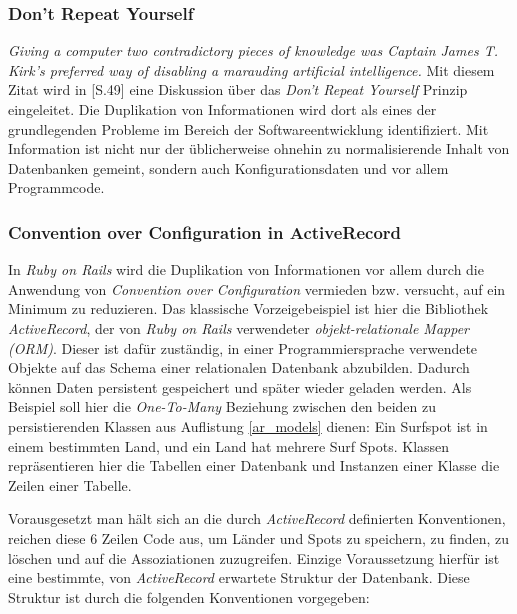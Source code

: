 \subsubsection{Don't Repeat Yourself}

\textit{Giving a computer two contradictory pieces of knowledge was
  Captain James T. Kirk's preferred way of disabling a marauding
  artificial intelligence.} Mit diesem Zitat wird in
\cite{Hunt99}[S.49] eine Diskussion über das \textit{Don't Repeat
  Yourself} Prinzip eingeleitet. Die Duplikation von Informationen
wird dort als eines der grundlegenden Probleme im Bereich der
Softwareentwicklung identifiziert. Mit Information ist nicht nur der
üblicherweise ohnehin zu normalisierende Inhalt von Datenbanken
gemeint, sondern auch Konfigurationsdaten und vor allem Programmcode.

\subsubsection{Convention over Configuration in ActiveRecord}
In \textit{Ruby on Rails} wird die Duplikation von Informationen vor
allem durch die Anwendung von \textit{Convention over Configuration}
vermieden bzw. versucht, auf ein Minimum zu reduzieren. Das klassische
Vorzeigebeispiel ist hier die Bibliothek \textit{ActiveRecord}, der
von \textit{Ruby on Rails} verwendeter \textit{objekt-relationale
  Mapper (ORM)}. Dieser ist dafür zuständig, in einer
Programmiersprache verwendete Objekte auf das Schema einer
relationalen Datenbank abzubilden. Dadurch können Daten persistent
gespeichert und später wieder geladen werden. Als Beispiel soll hier
die \textit{One-To-Many} Beziehung zwischen den beiden zu
persistierenden Klassen aus Auflistung \ref{ar_models} dienen: Ein
Surfspot ist in einem bestimmten Land, und ein Land hat mehrere Surf
Spots. Klassen repräsentieren hier die Tabellen einer Datenbank und
Instanzen einer Klasse die Zeilen einer Tabelle.



Vorausgesetzt man hält sich an die durch \textit{ActiveRecord}
definierten Konventionen, reichen diese 6 Zeilen Code aus, um Länder
und Spots zu speichern, zu finden, zu löschen und auf die
Assoziationen zuzugreifen. Einzige Voraussetzung hierfür ist eine
bestimmte, von \textit{ActiveRecord} erwartete Struktur der
Datenbank. Diese Struktur ist durch die folgenden Konventionen
vorgegeben:

